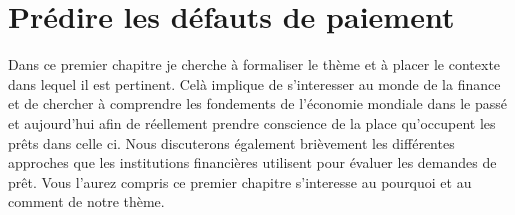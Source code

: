 \chapter{Prédire les défauts de paiement}
\label{chapter1}
Dans ce premier chapitre je cherche à formaliser le thème et à placer le contexte dans lequel il est pertinent. Celà implique de s'interesser au monde de la finance et de chercher à comprendre les fondements de l'économie mondiale dans le passé et aujourd'hui afin de réellement prendre conscience de la place qu'occupent les prêts dans celle ci. Nous discuterons également brièvement les différentes approches que les institutions financières utilisent pour évaluer les demandes de prêt. Vous l'aurez compris ce premier chapitre s'interesse au pourquoi et au comment de notre thème.





\clearpage